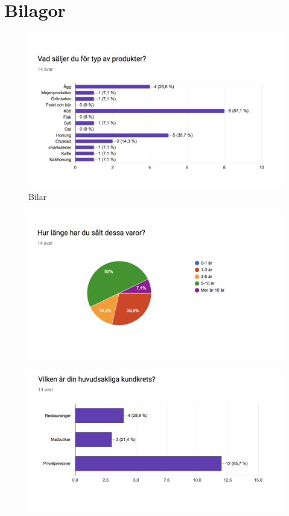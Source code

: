 \documentclass[10pt,a4paper,oneside]{article}
\begin{document}


\newpage

\section*{Bilagor}

\begin{figure}
	\includegraphics[scale=0.6]{1.png}
	\caption{Bilar}
\end{figure}

\begin{figure}
	\includegraphics[scale=0.6]{2.png}
\end{figure}

\begin{figure}
	\includegraphics[scale=0.6]{3.png}
\end{figure}
\end{document}
